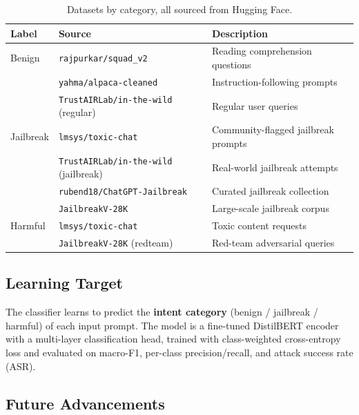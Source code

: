 \documentclass[11pt]{article}
\begin{document}
\begin{table}[h]
\centering
\small
\begin{tabular}{@{}llp{7.5cm}@{}}
\toprule
\textbf{Label} & \textbf{Source} & \textbf{Description} \\
\midrule
Benign      & \texttt{rajpurkar/squad\_v2}                          & Reading comprehension questions \\
            & \texttt{yahma/alpaca-cleaned}                         & Instruction-following prompts \\
            & \texttt{TrustAIRLab/in-the-wild} (regular)            & Regular user queries \\
\midrule
Jailbreak   & \texttt{lmsys/toxic-chat}                             & Community-flagged jailbreak prompts \\
            & \texttt{TrustAIRLab/in-the-wild} (jailbreak)          & Real-world jailbreak attempts \\
            & \texttt{rubend18/ChatGPT-Jailbreak}                   & Curated jailbreak collection \\
            & \texttt{JailbreakV-28K}                               & Large-scale jailbreak corpus \\
\midrule
Harmful     & \texttt{lmsys/toxic-chat}                             & Toxic content requests \\
            & \texttt{JailbreakV-28K} (redteam)                     & Red-team adversarial queries \\
\bottomrule
\end{tabular}
\caption{Datasets by category, all sourced from Hugging Face.}
\label{tab:datasets}
\end{table}

\vspace{-6pt}
\subsection*{Learning Target}

The classifier learns to predict the \textbf{intent category} (benign / jailbreak / harmful) of each input prompt. The model is a fine-tuned DistilBERT encoder with a multi-layer classification head, trained with class-weighted cross-entropy loss and evaluated on macro-F1, per-class precision/recall, and attack success rate (ASR).

\subsection*{Future Advancements}
\end{document}
